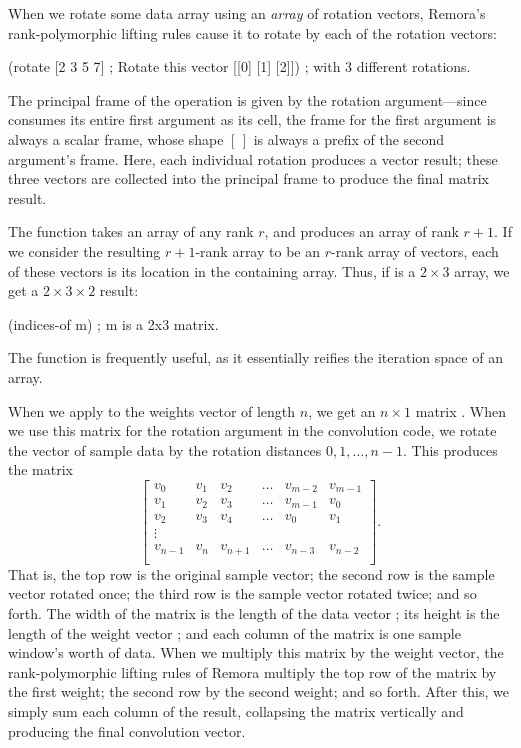 When we rotate some data array  using an \emph{array} of rotation vectors,
Remora's rank-polymorphic lifting rules cause it
to rotate  by each of the rotation vectors:
\begin{code}
    (rotate [2 3 5 7]      ; Rotate this vector
            [[0] [1] [2]]) ; with 3 different rotations.
\result{[[2 3 5 7]
 [3 5 7 2]
 [5 7 2 3]]}\end{code}
The principal frame of the operation is given by the rotation argument---since
 consumes its entire first argument as its cell,
the frame for the first argument is always a scalar frame, 
whose shape $[\,]$ is always a prefix of the second argument's frame.
Here, each individual rotation produces a vector result; these three
vectors are collected into the principal frame to produce the final matrix
result.

The  function takes an array of any rank $r$,
and produces an array of rank $r+1$.
If we consider the resulting $r+1$-rank array to be
an $r$-rank array of vectors,
each of these vectors is its location in the containing array.
Thus, if  is a $2 \times 3$ array, we get a $2 \times 3 \times 2$ result:
\begin{code}
    (indices-of m) ; m is a 2x3 matrix.
\result{[[[0 0]  [0 1]  [0 2]]
 [[1 0]  [1 1]  [1 2]]]}\end{code}
The  function is frequently useful,
as it essentially reifies the iteration space of an array.

When we apply  to the weights vector  of length $n$,
we get an $n \times 1$ matrix \ex{[[0] [1] {\ldots} [\(n-1\)]]}.
When we use this matrix for the rotation argument in the convolution code,
we rotate the vector of sample data 
by the rotation distances $0, 1, {\ldots}, n-1$.
This produces the matrix
\[
\left[
\begin{array}{llllll}
v_0     & v_1     & v_2     & \ldots & v_{m-2} & v_{m-1} \\
v_1     & v_2     & v_3     & \ldots & v_{m-1} & v_0     \\
v_2     & v_3     & v_4     & \ldots & v_0     & v_1     \\
\vdots                                                   \\
v_{n-1} & v_n     & v_{n+1} & \ldots & v_{n-3} & v_{n-2} \\
\end{array}\right]\text{.}
\]
That is, the top row is the original sample vector;
the second row is the sample vector rotated once;
the third row is the sample vector rotated twice;
and so forth.
The width of the matrix is the length of the data vector ;
its height is the length of the weight vector ;
and each column of the matrix is one sample window's worth of data.
When we multiply this matrix by the weight vector,
the rank-polymorphic lifting rules of Remora multiply the top row
of the matrix by the first weight;
the second row by the second weight;
and so forth.
After this, we simply sum each column of the result,
collapsing the matrix vertically and producing the final convolution vector.

